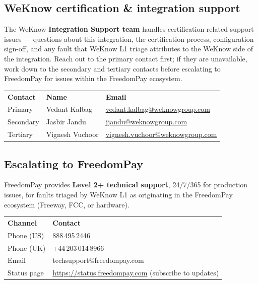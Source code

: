 \documentclass[a4paper,10pt]{article}
\begin{document}
\subsection{WeKnow certification \& integration support}\label{sec:wkg-support}

The WeKnow \textbf{Integration Support team} handles certification-related
support issues --- questions about this integration, the certification
process, configuration sign-off, and any fault that WeKnow L1 triage
attributes to the WeKnow side of the integration. Reach out to the primary
contact first; if they are unavailable, work down to the secondary and
tertiary contacts before escalating to FreedomPay for issues within the
FreedomPay ecosystem.

\begin{center}
\renewcommand{\arraystretch}{1.3}\small
\begin{tabularx}{\textwidth}{L{26mm} L{44mm} X}
\color{white}\textbf{Contact} &
\color{white}\textbf{Name} & \color{white}\textbf{Email}\\
Primary & Vedant Kalbag &
\href{mailto:vedant.kalbag@weknowgroup.com}{vedant.kalbag@weknowgroup.com}\\
Secondary & Jasbir Jandu &
\href{mailto:jjandu@weknowgroup.com}{jjandu@weknowgroup.com}\\
Tertiary & Vignesh Vuchoor &
\href{mailto:vignesh.vuchoor@weknowgroup.com}{vignesh.vuchoor@weknowgroup.com}\\
\end{tabularx}
\end{center}

\subsection{Escalating to FreedomPay}

FreedomPay provides \textbf{Level 2+ technical support}, 24/7/365 for
production issues, for faults triaged by WeKnow L1 as originating in the
FreedomPay ecosystem (Freeway, FCC, or hardware).

\begin{center}
\renewcommand{\arraystretch}{1.3}\small
\begin{tabularx}{\textwidth}{L{34mm} X}
\color{white}\textbf{Channel} &
\color{white}\textbf{Contact}\\
Phone (US) & 888\,495\,2446\\
Phone (UK) & +44\,203\,014\,8966\\
Email & techsupport@freedompay.com\\
Status page & \url{https://status.freedompay.com} (subscribe to updates)\\
\end{tabularx}
\end{center}
\end{document}
